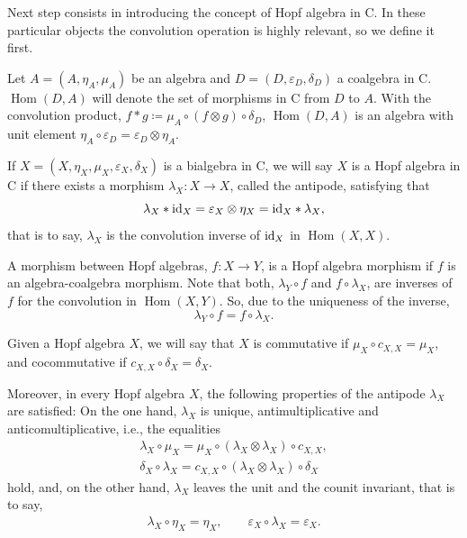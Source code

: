 \documentclass[10pt,a4paper]{amsart}
\numberwithin{equation}{section}
\newcommand{\ot}{\otimes}
\newcommand{\co}{\circ}
\DeclareMathOperator{\Hom}{Hom}
\begin{document}
Next step consists in introducing the concept of Hopf algebra in {\sf C}. In these particular objects the convolution operation is highly relevant, so we define it first.
\begin{Definition}
Let $A=(A,\eta_{A},\mu_{A})$ be an algebra and $D=(D,\varepsilon_{D},\delta_{D})$ a coalgebra in {\sf C}. $\Hom(D,A)$ will denote the set of morphisms in {\sf C} from $D$ to $A$. With the convolution product, $f\ast g\coloneqq\mu_{A}\circ(f\otimes g)\circ\delta_{D}$, $\Hom(D,A)$ is an algebra with unit element $\eta_{A}\circ\varepsilon_{D}=\varepsilon_{D}\otimes\eta_{A}$.
\end{Definition}
\begin{Definition}
If $X=(X,\eta_{X},\mu_{X},\varepsilon_{X},\delta_{X})$ is a bialgebra in {\sf C}, we will say $X$ is a Hopf algebra in {\sf C} if there exists a morphism $\lambda_{X}\colon X\rightarrow X$, called the antipode, satisfying that
\begin{equation}\label{antipode}
\lambda_{X}\ast {\rm id}_{X}=\varepsilon_{X}\otimes\eta_{X}={\rm id}_{X}\ast\lambda_{X},
\end{equation}
that is to say, $\lambda_{X}$ is the convolution inverse of ${\rm id}_{X}$ in $\Hom(X,X)$.

A morphism between Hopf algebras, $f\colon X\rightarrow Y$, is a Hopf algebra morphism if $f$ is an algebra-coalgebra morphism. Note that both, $\lambda_{Y}\circ f$ and $f\circ\lambda_{X}$, are inverses of $f$ for the convolution in $\Hom(X,Y)$. So, due to the uniqueness of the inverse,
\begin{equation}\label{morant}
\lambda_{Y}\circ f=f\circ\lambda_{X}.
\end{equation}

Given a Hopf algebra $X$, we will say that $X$ is commutative if $\mu_{X}\circ c_{X,X}=\mu_{X}$, and cocommutative if $c_{X,X}\circ\delta_{X}=\delta_{X}$.

Moreover, in every Hopf algebra $X$, the following properties of the antipode $\lambda_{X}$ are satisfied: On the one hand, $\lambda_{X}$ is unique, antimultiplicative and anticomultiplicative, i.e., the equalities
\begin{gather}
\lambda_{X}\co \mu_{X}= \mu_{X}\co (\lambda_{X}\ot \lambda_{X})\co c_{X,X},\nonumber
\\
\label{a-antip2}\delta_{X}\co \lambda_{X}=c_{X,X}\co (\lambda_{X}\ot \lambda_{X})\co \delta_{X}
\end{gather}
hold, and, on the other hand, $\lambda_{X}$ leaves the unit and the counit invariant, that is to say,
\begin{gather}
\lambda_{X}\co \eta_{X}= \eta_{X},\qquad
\label{u-antip2}\varepsilon_{X}\co \lambda_{X}=\varepsilon_{X}.
\end{gather}


\end{Definition}
\end{document}
